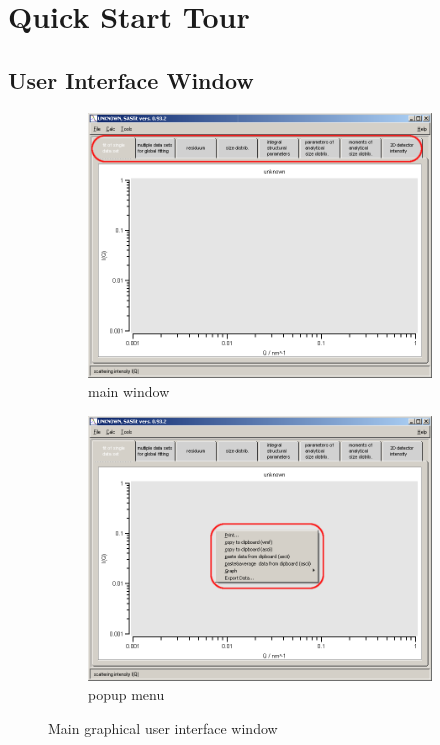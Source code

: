 \chapter{Quick Start Tour}

\section{User Interface Window}
\begin{figure}[htb]
\begin{subfigure}[b]{.48\textwidth}
   \centering
   \includegraphics[width=\textwidth]{QTmainA.png}
   \caption{main window}
   \label{fig:QTmainA}
\end{subfigure}
\hfill
\begin{subfigure}[b]{.48\textwidth}
   \centering
   \includegraphics[width=\textwidth]{QTmainB.png}
   \caption{popup menu}
   \label{fig:QTmainB}
\end{subfigure}
\caption{Main \SASfit graphical user interface window}
\label{fig:QTmain}
\end{figure}
